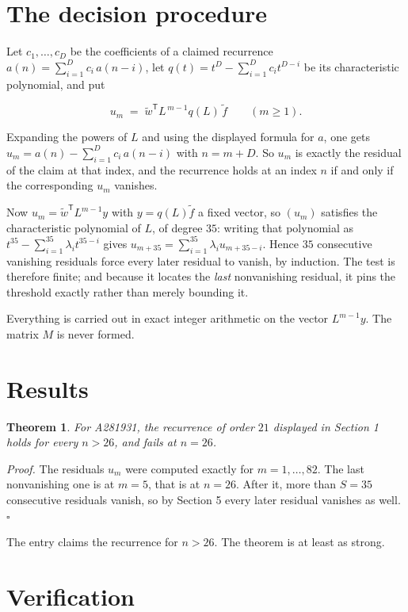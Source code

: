\documentclass[11pt]{article}
\newtheorem{theorem}{Theorem}
\theoremstyle{definition}
\begin{document}
\section{The decision procedure}

Let $c_1,\dots,c_D$ be the coefficients of a claimed recurrence $a(n) = \sum_{i=1}^{D} c_i\,a(n-i)$, let $q(t) = t^{D} - \sum_{i=1}^{D} c_i t^{D-i}$ be its characteristic polynomial, and put

\[u_m \;=\; \tilde w^{\mathsf T} L^{\,m-1} q(L)\,\tilde f \qquad (m \ge 1).\]

Expanding the powers of $L$ and using the displayed formula for $a$, one gets $u_m = a(n) - \sum_{i=1}^{D} c_i\,a(n-i)$ with $n = m + D$. So $u_m$ is exactly the residual of the claim at that index, and the recurrence holds at an index $n$ if and only if the corresponding $u_m$ vanishes.

Now $u_m = \tilde w^{\mathsf T} L^{m-1} y$ with $y = q(L)\tilde f$ a fixed vector, so $(u_m)$ satisfies the characteristic polynomial of $L$, of degree $35$: writing that polynomial as $t^{35} - \sum_{i=1}^{35} \lambda_i t^{35-i}$ gives $u_{m+35} = \sum_{i=1}^{35} \lambda_i u_{m+35-i}$. Hence $35$ consecutive vanishing residuals force every later residual to vanish, by induction. The test is therefore finite; and because it locates the {\itshape last} nonvanishing residual, it pins the threshold exactly rather than merely bounding it.

Everything is carried out in exact integer arithmetic on the vector $L^{m-1}y$. The matrix $M$ is never formed.

\section{Results}

\begin{theorem} For A281931, the recurrence of order $21$ displayed in Section 1 holds for every $n > 26$, and fails at $n = 26$.\end{theorem}

{\itshape Proof.} The residuals $u_m$ were computed exactly for $m = 1,\dots,82$. The last nonvanishing one is at $m = 5$, that is at $n = 26$. After it, more than $S = 35$ consecutive residuals vanish, so by Section 5 every later residual vanishes as well. $\square$

The entry claims the recurrence for $n > 26$. The theorem is at least as strong.

\section{Verification}
\end{document}
